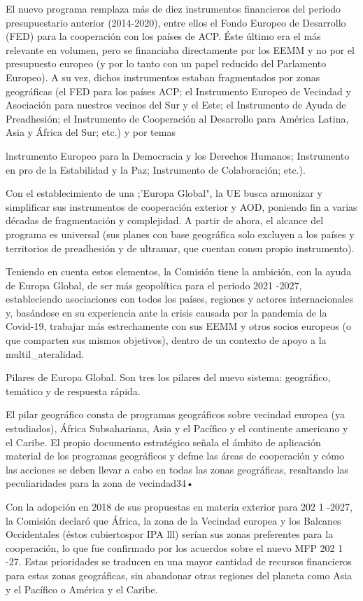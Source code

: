\documentclass[10pt,a4paper]{article}
\begin{document}
El nuevo programa remplaza más de diez instrumentos financieros del periodo presupuestario anterior (2014-2020), entre ellos el Fondo Europeo de Desarrollo (FED) para la cooperación con los países de ACP. Éste último era el más relevante en volumen, pero se financiaba directamente por los EEMM y no por el presupuesto europeo (y por lo tanto con un papel reducido del Parlamento Europeo). A su vez, dichos instrumentos estaban fragmentados por zonas geográficas (el FED para los países ACP; el Instrumento Europeo de Vecindad y Asociación para nuestros vecinos del Sur y el Este; el Instrumento de Ayuda de Preadhesión; el Instrumento de Cooperación al Desarrollo para América Latina, Asia y África del Sur; etc.) y por temas {lnstrumento Europeo para la Democracia y los Derechos Humanos; Instrumento en pro de la Estabilidad y la Paz; Instrumento de Colaboración; etc.).

Con el establecimiento de una ;'Europa Global", la UE busca armonizar y simplificar sus instrumentos de cooperación exterior y AOD, poniendo fin a varias décadas de fragmentación y complejidad. A partir de ahora, el alcance del programa es universal (sus planes con base  geográfica solo excluyen a los países y territorios de preadhesión y de ultramar, que cuentan consu propio instrumento).

Teniendo en cuenta estos elementos, la Comisión tiene la ambición, con la ayuda de Europa Global, de ser más geopolítica para el periodo 2021 -2027, estableciendo asociaciones con todos los países, regiones y actores internacionales y, basándose en su experiencia ante la crisis causada por la pandemia de la Covid-19, trabajar más estrechamente con sus EEMM y otros socios europeos (o que comparten sus mismos objetivos), dentro de un contexto de apoyo a la multil_ateralidad.


Pilares de Europa Global. Son tres los pilares del nuevo sistema: geográfico, temático y de respuesta rápida. 

El pilar geográfico consta de programas geográficos sobre vecindad europea (ya estudiados), África Subsahariana, Asia y el Pacífico y el continente americano y el Caribe. El propio documento estratégico señala el ámbito de aplicación material de los programas geográficos y defme las áreas de cooperación y cómo las acciones se deben llevar a cabo en todas las zonas geográficas, resaltando las peculiaridades para la zona de vecindad34•

Con la adopción en 2018 de sus propuestas en materia exterior para 202 1 -2027, la Comisión declaró que África, la zona de la Vecindad europea y los Balcanes Occidentales (éstos cubiertospor IPA lll) serían sus zonas preferentes para la cooperación, lo que fue confirmado por los acuerdos sobre el nuevo MFP 202 1 -27. Estas prioridades se traducen en una mayor cantidad de recursos financieros para estas zonas geográficas, sin abandonar otras regiones del planeta como Asia y el Pacífico o América y el Caribe.

}
\end{document}
